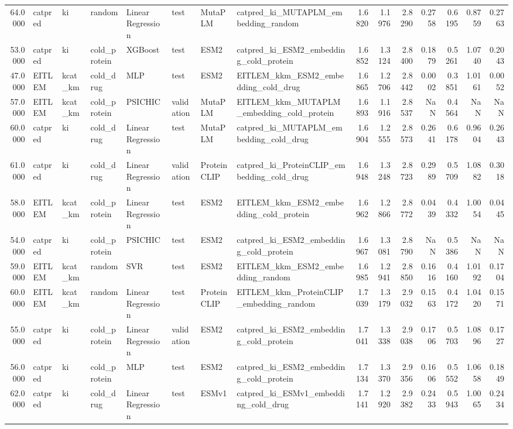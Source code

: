 \begin{tabular}{rlllllllrrrrrrr}
64.0000 & catpred & ki & random & Linear Regression & test & MutaPLM & catpred_ki_MUTAPLM_embedding_random & 1.6820 & 1.1976 & 2.8290 & 0.2758 & 0.6195 & 0.8759 & 0.2763 \\
53.0000 & catpred & ki & cold_protein & XGBoost & test & ESM2 & catpred_ki_ESM2_embedding_cold_protein & 1.6852 & 1.3124 & 2.8400 & 0.1879 & 0.5261 & 1.0740 & 0.2043 \\
47.0000 & EITLEM & kcat_km & cold_drug & MLP & test & ESM2 & EITLEM_kkm_ESM2_embedding_cold_drug & 1.6865 & 1.2706 & 2.8442 & 0.0002 & 0.3851 & 1.0161 & 0.0052 \\
57.0000 & EITLEM & kcat_km & cold_protein & PSICHIC & validation & MutaPLM & EITLEM_kkm_MUTAPLM_embedding_cold_protein & 1.6893 & 1.1916 & 2.8537 & NaN & 0.4564 & NaN & NaN \\
60.0000 & catpred & ki & cold_drug & Linear Regression & test & MutaPLM & catpred_ki_MUTAPLM_embedding_cold_drug & 1.6904 & 1.2555 & 2.8573 & 0.2641 & 0.6178 & 0.9604 & 0.2643 \\
61.0000 & catpred & ki & cold_drug & Linear Regression & validation & ProteinCLIP & catpred_ki_ProteinCLIP_embedding_cold_drug & 1.6948 & 1.3248 & 2.8723 & 0.2989 & 0.5709 & 1.0882 & 0.3018 \\
58.0000 & EITLEM & kcat_km & cold_protein & Linear Regression & test & ESM2 & EITLEM_kkm_ESM2_embedding_cold_protein & 1.6962 & 1.2866 & 2.8772 & 0.0439 & 0.4332 & 1.0054 & 0.0445 \\
54.0000 & catpred & ki & cold_protein & PSICHIC & test & ESM2 & catpred_ki_ESM2_embedding_cold_protein & 1.6967 & 1.3081 & 2.8790 & NaN & 0.5386 & NaN & NaN \\
59.0000 & EITLEM & kcat_km & random & SVR & test & ESM2 & EITLEM_kkm_ESM2_embedding_random & 1.6985 & 1.2941 & 2.8850 & 0.1616 & 0.4160 & 1.0192 & 0.1704 \\
60.0000 & EITLEM & kcat_km & random & Linear Regression & test & ProteinCLIP & EITLEM_kkm_ProteinCLIP_embedding_random & 1.7039 & 1.3179 & 2.9032 & 0.1563 & 0.4172 & 1.0420 & 0.1571 \\
55.0000 & catpred & ki & cold_protein & Linear Regression & validation & ESM2 & catpred_ki_ESM2_embedding_cold_protein & 1.7041 & 1.3338 & 2.9038 & 0.1706 & 0.5703 & 1.0896 & 0.1727 \\
56.0000 & catpred & ki & cold_protein & MLP & test & ESM2 & catpred_ki_ESM2_embedding_cold_protein & 1.7134 & 1.3370 & 2.9356 & 0.1606 & 0.5552 & 1.0658 & 0.1849 \\
62.0000 & catpred & ki & cold_drug & Linear Regression & test & ESMv1 & catpred_ki_ESMv1_embedding_cold_drug & 1.7141 & 1.2920 & 2.9382 & 0.2433 & 0.5943 & 1.0065 & 0.2434 \\

\end{tabular}
